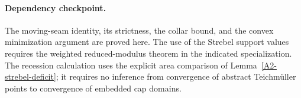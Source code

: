 \paragraph{Dependency checkpoint.}
The moving-seam identity, its strictness, the collar bound, and the
convex minimization argument are proved here. The use of the
Strebel support values requires the weighted reduced-modulus theorem
in the indicated specialization. The recession calculation uses the
explicit area comparison of Lemma~\ref{A2-strebel-deficit}; it requires
no inference from convergence of abstract Teichm\"uller points to
convergence of embedded cap domains.
